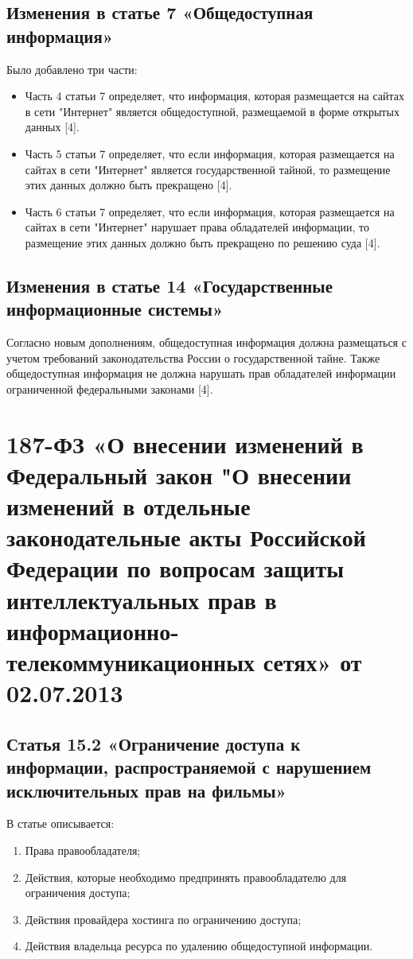 \documentclass[14pt,a4paper,report]{article}
\begin{document}
\subsection{Изменения в статье 7 «Общедоступная информация»}

Было добавлено три части:

\begin{itemize}
	\item Часть 4 статьи 7 определяет, что информация, которая размещается на сайтах в сети "Интернет" является общедоступной, размещаемой в форме открытых данных [4].
	\item Часть 5 статьи 7 определяет, что если информация, которая размещается на сайтах в сети "Интернет" является государственной тайной, то размещение этих данных должно быть прекращено [4].
	\item Часть 6 статьи 7 определяет, что если информация, которая размещается на сайтах в сети "Интернет" нарушает права обладателей информации, то размещение этих данных должно быть прекращено по решению суда [4].
\end{itemize}

\subsection{Изменения в статье 14 «Государственные информационные системы»}

Согласно новым дополнениям, общедоступная информация должна размещаться с учетом требований законодательства России о государственной тайне. Также общедоступная информация не должна нарушать прав обладателей информации ограниченной федеральными законами [4].

\section{187-ФЗ «О внесении изменений в Федеральный закон "О внесении изменений в отдельные законодательные акты Российской Федерации по вопросам защиты интеллектуальных прав в информационно-телекоммуникационных сетях» от 02.07.2013}

\subsection{Статья 15.2 «Ограничение доступа к информации, распространяемой с нарушением исключительных прав на фильмы»}

В статье описывается:

\begin{enumerate}
	\item Права правообладателя;
	\item Действия, которые необходимо предпринять правообладателю для ограничения доступа;
	\item Действия провайдера хостинга по ограничению доступа;
	\item Действия владельца ресурса по удалению общедоступной информации.
\end{enumerate}
\end{document}
